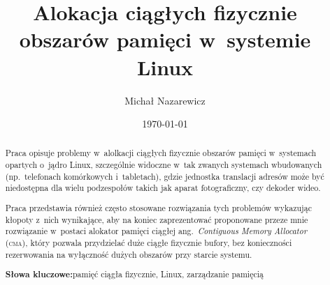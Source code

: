 \documentclass[runningheads,a4paper,twoside]{llncs}
\title{Alokacja ciągłych fizycznie obszarów pamięci w~systemie Linux}
\author{Michał Nazarewicz}
\date{\today}
\institute{Instytut Informatyki Politechniki Warszawskiej,\\
\href{mailto:mina86@mina86.com}{\path|mina86@mina86.com|}}
\newcommand*{\ang}[1]{ang.\ \textit{#1}}
\newcommand{\acc}[1]{\textsc{\lowercase{#1}}}
\newcommand{\keywords}[1]{\par\addvspace\baselineskip
\noindent\textbf{Słowa kluczowe:}\enspace\ignorespaces#1}
\begin{document}

\mainmatter

\maketitle

\begin{abstract}
Praca opisuje problemy w~alolkacji ciągłych fizycznie obszarów pamięci
w~systemach opartych o~jądro Linux, szczególnie widoczne w~tak
zwanych systemach wbudowanych (np.\ telefonach komórkowych
i~tabletach), gdzie jednostka translacji adresów może być niedostępna
dla wielu podzespołów takich jak aparat fotograficzny, czy dekoder
wideo.

Praca przedstawia również często stosowane rozwiązania tych problemów
wykazując kłopoty z~nich wynikające, aby na koniec zaprezentować
proponowane przeze mnie rozwiązanie w~postaci alokator pamięci ciągłej
\ang{Contiguous Memory Allocator} (\acc{CMA}), który pozwala przydzielać
duże ciągłe fizycznie bufory, bez konieczności rezerwowania na
wyłączność dużych obszarów przy starcie systemu.

\keywords{pamięć ciągła fizycznie, Linux, zarządzanie pamięcią}
\end{abstract}






\appendix
\printbibliography
\end{document}
